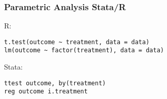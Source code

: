 \documentclass[14pt]{beamer} %
\begin{document}
\begin{frame}[fragile]

\frametitle{Parametric Analysis Stata/R}

R:\small
\begin{verbatim}
t.test(outcome ~ treatment, data = data)
lm(outcome ~ factor(treatment), data = data)
\end{verbatim}

\vspace{1em}

Stata:\small
\begin{verbatim}
ttest outcome, by(treatment)
reg outcome i.treatment
\end{verbatim}

\end{frame}




\appendix
\frame{}
\end{document}
